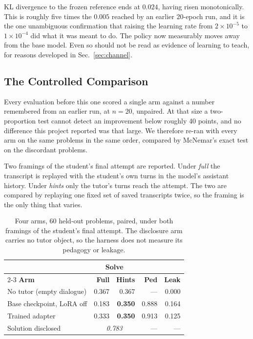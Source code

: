 \documentclass[conference]{IEEEtran}
\begin{document}
KL divergence to the frozen reference ends at $0.024$, having risen
monotonically. This is roughly five times the $0.005$ reached by an earlier
20-epoch run, and it is the one unambiguous confirmation that raising the
learning rate from $2\times10^{-5}$ to $1\times10^{-4}$ did what it was
meant to do. The policy now measurably moves away from the base model.
Even so should not be read as evidence of learning
to teach, for reasons developed in Sec.~\ref{sec:channel}.

\subsection{The Controlled Comparison}
\label{sec:controlled}

Every evaluation before this one scored a single arm against a number
remembered from an earlier run, at $n{=}20$, unpaired. At that size a
two-proportion test cannot detect an improvement below roughly 40 points, and
no difference this project reported was that large. We therefore re-ran with
every arm on the same problems in the same order, compared by McNemar's exact
test on the discordant problems.

Two framings of the student's final attempt are reported. Under \emph{full} the
transcript is replayed with the student's own turns in the model's assistant
history. Under \emph{hints} only the tutor's turns reach the attempt. The two
are compared by replaying one fixed set of saved transcripts twice, so the
framing is the only thing that varies.

\begin{table}[t]
\caption{Four arms, 60 held-out problems, paired, under both framings of the
student's final attempt. The disclosure arm carries no tutor object, so the
harness does not measure its pedagogy or leakage.}
\label{tab:threearm}
\centering
\small
\begin{tabular}{lrrrr}
\toprule
 & \multicolumn{2}{c}{\textbf{Solve}} & & \\
\cmidrule(lr){2-3}
\textbf{Arm} & \textbf{Full} & \textbf{Hints} & \textbf{Ped} & \textbf{Leak} \\
\midrule
No tutor (empty dialogue)   & 0.367 & 0.367 & ---   & 0.000 \\
Base checkpoint, LoRA off   & 0.183 & \textbf{0.350} & 0.888 & 0.164 \\
Trained adapter             & 0.333 & \textbf{0.350} & 0.913 & 0.125 \\
Solution disclosed          & \multicolumn{2}{c}{\textit{0.783}} & --- & --- \\
\bottomrule
\end{tabular}
\end{table}
\end{document}
